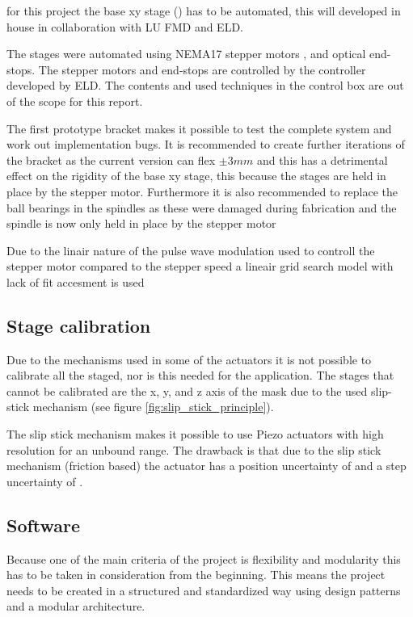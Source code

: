 \documentclass[10pt]{article}
\begin{document}
for this project the base xy stage () has to be automated, this will developed in house in collaboration with LU FMD and ELD. 

The stages were automated using NEMA17 stepper motors , and optical end-stops.
The stepper motors and end-stops are controlled by the controller developed by ELD.
The contents and used techniques in the control box are out of the scope for this report.

The first prototype bracket makes it possible to test the complete system and work out implementation bugs. 
It is recommended to create further iterations of the bracket as the current version can flex $\pm 3mm$ and this has a detrimental effect on the rigidity of the base xy stage, this because the stages are held in place by the stepper motor. 
Furthermore it is also recommended to replace the ball bearings in the spindles as these were damaged during fabrication and the spindle is now only held in place by the stepper motor


Due to the linair nature of the pulse wave modulation used to controll the stepper motor compared to the stepper speed a lineair grid search model with lack of fit accesment is used

\subsection{Stage calibration}
Due to the mechanisms used in some of the actuators it is not possible to calibrate all the staged,
nor is this needed for the application. 
The stages that cannot be calibrated are the x, y, and z axis of the mask due to the used slip-stick mechanism (see figure \ref{fig:slip_stick_principle}). 

The slip stick mechanism makes it possible to use Piezo actuators with high resolution for an unbound range.
The drawback is that due to the slip stick mechanism (friction based) the actuator has a position uncertainty of  and a step uncertainty of .

\subsection{Software}
Because one of the main criteria of the project is flexibility and modularity this has to be taken in consideration from the beginning. 
This means the project needs to be created in a structured and standardized way using design patterns and a modular architecture.
\end{document}
